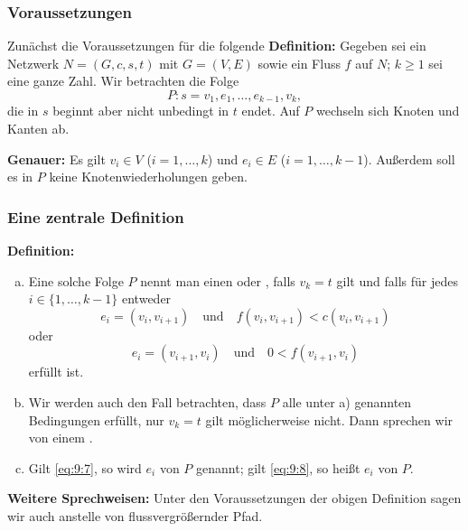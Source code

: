 \documentclass[smaller]{beamer}
\begin{document}
\begin{frame}
 \frametitle{Voraussetzungen}
 Zunächst die \alert{Voraussetzungen für die folgende \textbf{Definition:}} Gegeben sei ein Netzwerk $N=(G,c,s,t)$ mit $G=(V,E)$ sowie ein Fluss $f$ auf $N$; $k\geq 1$ sei eine ganze Zahl. Wir betrachten die Folge
	\begin{equation}
	\label{eq:9:6}
	P: s = v_1,e_1,\ldots,e_{k-1},v_k,
	\end{equation}
	die in $s$ beginnt aber nicht unbedingt in $t$ endet. Auf $P$ wechseln sich Knoten und Kanten ab. \\ \vspace*{0.2cm}
	
	\textbf{Genauer:} Es gilt $v_i \in V$ ($i=1,\ldots,k$) und $e_i \in E$ ($i=1,\ldots,k-1$). Außerdem soll es in $P$ \alert{keine Knotenwiederholungen} geben.
\end{frame}

\begin{frame}
 \frametitle{Eine zentrale Definition}
 \textbf{Definition:}
 \begin{enumerate}[a)]
		\item Eine solche Folge $P$ nennt man einen  oder , falls $v_k=t$ gilt und falls für jedes $i \in \big\{ 1,\ldots,k-1 \big\}$ entweder
		\begin{equation}
		\label{eq:9:7}
		e_i = (v_i,v_{i+1}) \quad\text{und}\quad f(v_i,v_{i+1}) < c(v_i, v_{i+1})
		\end{equation}
		oder
		\begin{equation}
		\label{eq:9:8}
		e_i = (v_{i+1}, v_i) \quad\text{und}\quad 0 < f(v_{i+1}, v_i)
		\end{equation} 
		erfüllt ist.
		
		\item Wir werden auch den Fall betrachten, dass $P$ alle unter a) genannten Bedingungen erfüllt, nur $v_k=t$ gilt möglicherweise nicht. Dann sprechen wir von einem . \label{page:9:7}
		
		\item Gilt \eqref{eq:9:7}, so wird $e_i$  von $P$ genannt; gilt \eqref{eq:9:8}, so heißt $e_i$  von $P$.
	\end{enumerate}
 \textbf{Weitere Sprechweisen:} Unter den Voraussetzungen der obigen Definition sagen wir auch  anstelle von flussvergrößernder Pfad. 
\end{frame}
\end{document}

